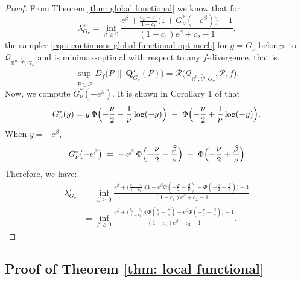 \documentclass[accepted]{article}
\theoremstyle{plain} %
\theoremstyle{definition}
\theoremstyle{remark}
\newcommand{\eps}{\varepsilon}
\newcommand{\bQ}{\mathbf{Q}}
\newcommand{\R}{\mathbb{R}}
\begin{document}
\begin{proof}
    From Theorem \ref{thm: global functional} we know that for
    \[
    \lambda^\star_{G_\nu} 
    = \inf_{\beta \geq 0} 
    \frac{e^\beta + \frac{c_2 - c_1}{1 - c_1} \big( 1 + G_\nu^*(-e^\beta) \big) - 1}
         {(1 - c_1)e^\beta + c_2 - 1}.
    \]
   the sampler  \eqref{eqn: continuous global functional opt mech} for $g=G_\nu$ belongs to $\mathcal{Q}_{\R^n, \tilde{\mathcal{P}}, G_\nu}$ and is minimax-optimal with respect to any $f$-divergence, that is,
\begin{equation*}
    \sup_{P \in \tilde{\mathcal{P}}} D_f\big(P \, \| \, \bQ^\star_{G_\nu}(P)\big)
    = \mathcal{R}\big(\mathcal{Q}_{\R^n, \tilde{\mathcal{P}},G_\nu}, \tilde{\mathcal{P}}, f\big).
\end{equation*}
    Now, we compute $G_\nu^*(-e^\beta)$. It is shown in Corollary 1 of \citet{dong2022gaussian} that 
\[
G_\nu^*(y)
  = y\,\Phi\Bigl(-\frac{\nu}{2}-\frac{1}{\nu}\log(-y)\Bigr)\;-\;
  \Phi\Bigl(-\frac{\nu}{2}+\frac{1}{\nu}\log(-y)\Bigr).
\]
When $y = -e^\beta$,
\[G^*_{\nu}\bigl(-e^{\beta}\bigr)
  \;=\;
  -\,e^{\beta}\,
    \Phi\Bigl(-\frac{\nu}{2}-\frac{\beta}{\nu}\Bigr)
  \;-\;
    \Phi\Bigl(-\frac{\nu}{2}+\frac{\beta}{\nu}\Bigr)\]
Therefore, we have:
\begin{align*}
\lambda^\star_{G_\nu} & =\inf_{\beta \geq 0} 
    \frac{e^\beta + \Big(\frac{c_2 - c_1}{1 - c_1}\Big) \bigg( 1 -e^\beta \Phi\left(-\frac{\nu}{2} - \frac{\beta}{\nu}\right) - \Phi\left(-\frac{\nu}{2} + \frac{\beta}{\nu}\right) \bigg) - 1}
         {(1 - c_1)e^\beta + c_2 - 1}\\
         & = \inf_{\beta \geq 0} 
    \frac{e^\beta + \Big(\frac{c_2 - c_1}{1 - c_1}\Big) \bigg( \Phi\left(\frac{\nu}{2} - \frac{\beta}{\nu}\right)  -e^\beta \Phi\left(-\frac{\nu}{2} - \frac{\beta}{\nu}\right)  \bigg) - 1}
         {(1 - c_1)e^\beta + c_2 - 1}.    
\end{align*}

\end{proof}

\subsection{Proof of Theorem \ref{thm: local functional}}
 
\end{document}
